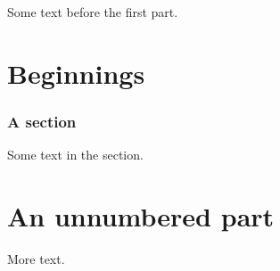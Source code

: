 \documentclass{article}
\begin{document}
Some text before the first part.
\part{Beginnings}
\section{A section}
Some text in the section.
\part*{An unnumbered part}
More text.
\end{document}
